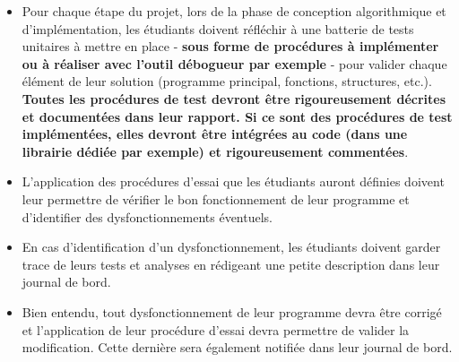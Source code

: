 \documentclass[10pt, fleqn, a4paper]{article}
\newcommand{\bfcolor}[2]{\textcolor{#1}{\textbf{#2}}}
\begin{document}
{\begin{minipage}[l]{\textwidth}

\begin{itemize}
\item[\ding{223}] Pour chaque étape du projet, lors de la phase de conception algorithmique et d'implémentation, les étudiants doivent réfléchir à une batterie de tests unitaires à mettre en place - \textbf{sous forme de procédures à implémenter ou à réaliser avec l'outil \bfcolor{greenC2}{débogueur} par exemple} - pour valider chaque élément de leur solution (programme principal, fonctions, structures, etc.). \bfcolor{redCM}{Toutes les procédures de test devront être rigoureusement décrites et documentées dans leur rapport. Si ce sont des procédures de test implémentées, elles devront être intégrées au code (dans une librairie dédiée par exemple) et rigoureusement commentées}.
\end{itemize}


\begin{itemize}
\item[\ding{223}] L'application des procédures d'essai que les étudiants auront définies doivent leur permettre de vérifier le bon fonctionnement de leur programme et d'identifier des dysfonctionnements éventuels.
\end{itemize}


\begin{itemize}
\item[\ding{223}] En cas d'identification d'un dysfonctionnement, les étudiants doivent garder trace de leurs tests et analyses en rédigeant une petite description dans leur \colorbox{yellowPORTFOLIO}{journal de bord}.
\end{itemize}


\begin{itemize}
\item[\ding{223}] Bien entendu, tout dysfonctionnement de leur programme devra être corrigé et l'application de leur procédure d'essai devra permettre de valider la modification. Cette dernière sera également notifiée dans leur \colorbox{yellowPORTFOLIO}{journal de bord}.
\end{itemize}
\end{minipage}}
\end{document}
